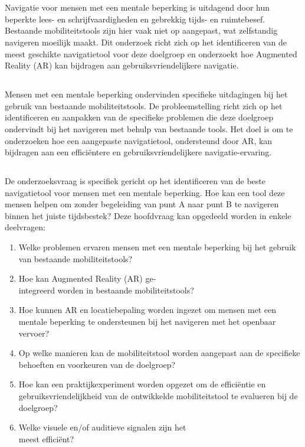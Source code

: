 \chapter{}%
\label{ch:inleiding}
Navigatie voor mensen met een mentale beperking is uitdagend door hun beperkte lees- en schrijfvaardigheden en gebrekkig tijds- en ruimtebesef. Bestaande mobiliteitstools zijn hier vaak niet op aangepast, wat zelfstandig navigeren moeilijk maakt. Dit onderzoek richt zich op het identificeren van de meest geschikte navigatietool voor deze doelgroep en onderzoekt hoe Augmented Reality (AR) kan bijdragen aan gebruiksvriendelijkere navigatie.

\section{}%
\label{sec:probleemstelling}

Mensen met een mentale beperking ondervinden specifieke uitdagingen bij het gebruik van bestaande mobiliteitstools. De probleemstelling richt zich op het identificeren en aanpakken van de specifieke problemen die deze doelgroep ondervindt bij het navigeren met behulp van bestaande tools. Het doel is om te onderzoeken hoe een aangepaste navigatietool, ondersteund door AR, kan bijdragen aan een efficiëntere en gebruiksvriendelijkere navigatie-ervaring.

\section{}%
\label{sec:onderzoeksvraag}

De onderzoeksvraag is specifiek gericht op het identificeren van de beste navigatietool voor mensen met een mentale beperking. Hoe kan een tool deze mensen helpen om zonder begeleiding van punt A naar punt B te navigeren binnen het juiste tijdsbestek? Deze hoofdvraag kan opgedeeld worden in enkele deelvragen:

\begin{enumerate}
    \item Welke problemen ervaren mensen met een mentale beperking bij het gebruik van bestaande mobiliteitstools?
    \item Hoe kan Augmented Reality (AR) ge-\\integreerd worden in bestaande mobiliteits\-tools?
    \item Hoe kunnen AR en locatiebepaling worden ingezet om mensen met een mentale beperking te ondersteunen bij het navigeren met het openbaar vervoer?
    \item Op welke manieren kan de mobiliteitstool worden aangepast aan de specifieke behoeften en voorkeuren van de doelgroep?
    \item Hoe kan een praktijkexperiment worden opgezet om de efficiëntie en gebruiksvriendelijkheid van de ontwikkelde mobiliteitstool te evalueren bij de doelgroep?
    \item Welke visuele en/of auditieve signalen zijn het \\meest efficiënt?
\end{enumerate}

